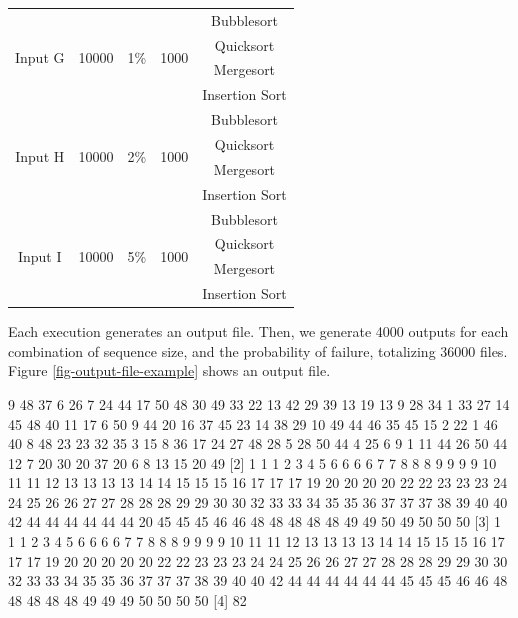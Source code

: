 \begin{table}[H]
\begin{center}
\begin{tabular}{|c|c|c|c|c|}
    \hline
    \multirow{4}{*}{Input G} & \multirow{4}{*}{10000} & \multirow{4}{*}{1\%} & \multirow{4}{*}{1000} & Bubblesort \\ 
    & & & & Quicksort \\
    & & & & Mergesort \\
    & & & & Insertion Sort \\
    \hline
    \multirow{4}{*}{Input H} & \multirow{4}{*}{10000} & \multirow{4}{*}{2\%} & \multirow{4}{*}{1000} & Bubblesort \\ 
    & & & & Quicksort \\
    & & & & Mergesort \\
    & & & & Insertion Sort \\
    \hline
    \multirow{4}{*}{Input I} & \multirow{4}{*}{10000} & \multirow{4}{*}{5\%} & \multirow{4}{*}{1000} & Bubblesort \\ 
    & & & & Quicksort \\
    & & & & Mergesort \\
    & & & & Insertion Sort \\
    \hline
    \end{tabular}
    \label{table-input-data}
    \end{center}
\end{table}

Each execution generates an output file. Then, we generate 4000 outputs for each combination of sequence size, and the probability of failure, totalizing 36000 files. Figure \ref{fig-output-file-example} shows an output file.

\begin{verbbox}[\mbox{}]
[1]  9 48 37 6 26 7 24 44 17 50 48 30 49 33 22 13 42 29 39 13 19 13 9 28 34 1
33 27 14 45 48 40 11 17 6 50 9 44 20 16 37 45 23 14 38 29 10 49 44 46 35 45  
15 2 22 1 46 40 8 48 23 23 32 35 3 15 8 36 17 24 27 48 28 5 28 50 44 4 25 6 9
1 11 44 26 50 44 12 7 20 30 20 37 20 6 8 13 15 20 49
[2]  1 1 1 2 3 4 5 6 6 6 6 7 7 8 8 8 9 9 9 9 10 11 11 12 13 13 13 13 14 14 15 
15 15 16 17 17 17 19 20 20 20 20 22 22 23 23 23 24 24 25 26 26 27 27 28 28 28 
29 29 30 30 32 33 33 34 35 35 36 37 37 37 38 39 40 40 42 44 44 44 44 44 44 20 
45 45 45 46 46 48 48 48 48 48 49 49 50 49 50 50 50
[3]  1 1 1 2 3 4 5 6 6 6 6 7 7 8 8 8 9 9 9 9 10 11 11 12 13 13 13 13 14 14 15 
15 15 16 17 17 17 19 20 20 20 20 20 22 22 23 23 23 24 24 25 26 26 27 27 28 28 
28 29 29 30 30 32 33 33 34 35 35 36 37 37 37 38 39 40 40 42 44 44 44 44 44 44 
45 45 45 46 46 48 48 48 48 48 49 49 49 50 50 50 50
[4]  82
\end{verbbox}
    
